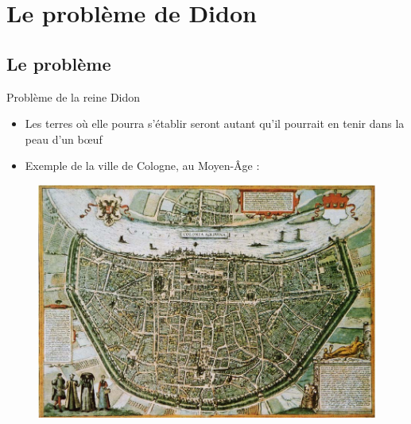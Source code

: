 \documentclass[11pt,envcountsect,aspectratio=169]{beamer} %
\begin{document}
\section{Le problème de Didon}


\subsection{Le problème}


\begin{frame}{Problème de la reine Didon}

    \begin{itemize}
        \item Les terres où elle pourra s'établir seront \og autant qu'il pourrait en tenir dans la peau d'un b\oe{}uf\fg{}
        \item Exemple de la ville de Cologne, au Moyen-Âge :
    \end{itemize}
    
    \begin{figure}
        \includegraphics[scale=0.6]{img/cologne.jpg}
    \end{figure}

\end{frame}
\end{document}
